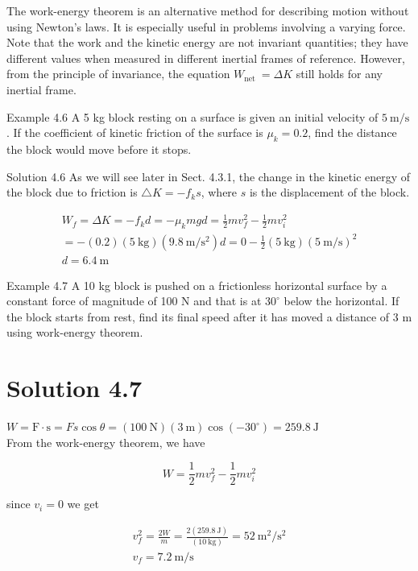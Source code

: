 \documentclass[10pt]{article}
\begin{document}
The work-energy theorem is an alternative method for describing motion without using Newton's laws. It is especially useful in problems involving a varying force. Note that the work and the kinetic energy are not invariant quantities; they have different values when measured in different inertial frames of reference. However, from the principle of invariance, the equation $W_{\text {net }}=\Delta K$ still holds for any inertial frame.

Example 4.6 A 5 kg block resting on a surface is given an initial velocity of $5 \mathrm{~m} / \mathrm{s}$. If the coefficient of kinetic friction of the surface is $\mu_{k}=0.2$, find the distance the block would move before it stops.

Solution 4.6 As we will see later in Sect. 4.3.1, the change in the kinetic energy of the block due to friction is $\triangle K=-f_{k} s$, where $s$ is the displacement of the block.

$$
\begin{gathered}
W_{f}=\Delta K=-f_{k} d=-\mu_{k} m g d=\frac{1}{2} m v_{f}^{2}-\frac{1}{2} m v_{i}^{2} \\
=-(0.2)(5 \mathrm{~kg})\left(9.8 \mathrm{~m} / \mathrm{s}^{2}\right) d=0-\frac{1}{2}(5 \mathrm{~kg})(5 \mathrm{~m} / \mathrm{s})^{2} \\
d=6.4 \mathrm{~m}
\end{gathered}
$$

Example 4.7 A 10 kg block is pushed on a frictionless horizontal surface by a constant force of magnitude of 100 N and that is at $30^{\circ}$ below the horizontal. If the block starts from rest, find its final speed after it has moved a distance of 3 m using work-energy theorem.

\section*{Solution 4.7}
$W=\mathrm{F} \cdot \mathrm{s}=F s \cos \theta=(100 \mathrm{~N})(3 \mathrm{~m}) \cos \left(-30^{\circ}\right)=259.8 \mathrm{~J}$\\
From the work-energy theorem, we have

$$
W=\frac{1}{2} m v_{f}^{2}-\frac{1}{2} m v_{i}^{2}
$$

since $v_{i}=0$ we get

$$
\begin{gathered}
v_{f}^{2}=\frac{2 W}{m}=\frac{2(259.8 \mathrm{~J})}{(10 \mathrm{~kg})}=52 \mathrm{~m}^{2} / \mathrm{s}^{2} \\
v_{f}=7.2 \mathrm{~m} / \mathrm{s}
\end{gathered}
$$
\end{document}
